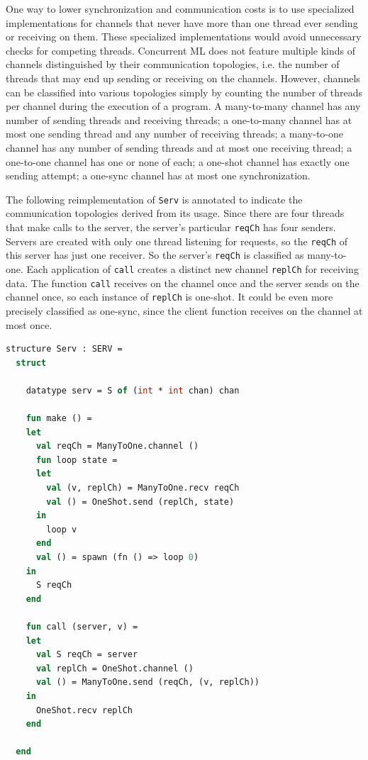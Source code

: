 \documentclass[letterpaper, 11pt]{report}
\begin{document}
One way to lower synchronization and communication costs is to use specialized implementations
for channels that never have more than one thread ever sending or receiving on them. These
specialized implementations would avoid unnecessary checks for competing threads.
Concurrent ML does not feature multiple kinds of channels distinguished by their communication
topologies, i.e. the number of threads that may end up sending or receiving on the channels.
However, channels can be classified into various topologies simply by counting the number of
threads per channel during the execution of a program. A many-to-many channel has any number
of sending threads and receiving threads;
a one-to-many channel has at most one sending thread and
any number of receiving threads;
a many-to-one channel has any number of sending threads and at most one receiving thread;
a one-to-one channel has one or none of each;
a one-shot channel has exactly one sending attempt;
a one-sync channel has at most one synchronization.

The following reimplementation of \lstinline{Serv} is annotated to indicate the communication topologies
derived from its usage. Since there are four threads that make calls to the server, the
server's particular \lstinline{reqCh} has four senders. Servers are created with only one
thread listening for requests, so the \lstinline{reqCh} of this server has just one receiver.
So the server's \lstinline{reqCh} is classified as many-to-one.
Each application of \lstinline{call} creates a distinct
new channel \lstinline{replCh} for receiving data. The function \lstinline{call} receives on the channel
once and the server sends on the channel once, so each instance of \lstinline{replCh} is
one-shot. It could be even more precisely classified as one-sync, since the client function receives on
the channel at most once.

\begin{lstlisting}[language=ML, mathescape]
  structure Serv : SERV =
  struct 

    datatype serv = S of (int * int chan) chan 

    fun make () =
    let 
      val reqCh = ManyToOne.channel ()
      fun loop state =
      let
        val (v, replCh) = ManyToOne.recv reqCh
        val () = OneShot.send (replCh, state)
      in
        loop v
      end
      val () = spawn (fn () => loop 0)
    in
      S reqCh
    end 

    fun call (server, v) =
    let 
      val S reqCh = server
      val replCh = OneShot.channel ()
      val () = ManyToOne.send (reqCh, (v, replCh))
    in
      OneShot.recv replCh
    end

  end
\end{lstlisting}
\end{document}
